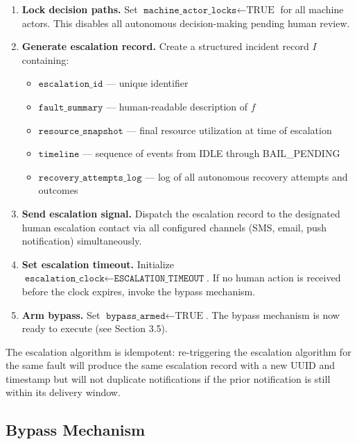 \begin{algorithm}
\caption{Escalation Algorithm}
\label{alg:escalation}
\begin{enumerate}
  \item \textbf{Lock decision paths.} Set $\texttt{machine\_actor\_locks} \leftarrow \text{TRUE}$ for all machine actors. This disables all autonomous decision-making pending human review.
  \item \textbf{Generate escalation record.} Create a structured incident record $I$ containing:
  \begin{itemize}
    \item $\texttt{escalation\_id}$ — unique identifier
    \item $\texttt{fault\_summary}$ — human-readable description of $f$
    \item $\texttt{resource\_snapshot}$ — final resource utilization at time of escalation
    \item $\texttt{timeline}$ — sequence of events from IDLE through BAIL\_PENDING
    \item $\texttt{recovery\_attempts\_log}$ — log of all autonomous recovery attempts and outcomes
  \end{itemize}
  \item \textbf{Send escalation signal.} Dispatch the escalation record to the designated human escalation contact via all configured channels (SMS, email, push notification) simultaneously.
  \item \textbf{Set escalation timeout.} Initialize $\texttt{escalation\_clock} \leftarrow \texttt{ESCALATION\_TIMEOUT}$. If no human action is received before the clock expires, invoke the bypass mechanism.
  \item \textbf{Arm bypass.} Set $\texttt{bypass\_armed} \leftarrow \text{TRUE}$. The bypass mechanism is now ready to execute (see Section 3.5).
\end{enumerate}
\end{algorithm}

\bigskip

The escalation algorithm is idempotent: re-triggering the escalation algorithm for the same fault will produce the same escalation record with a new UUID and timestamp but will not duplicate notifications if the prior notification is still within its delivery window.

\subsection{Bypass Mechanism}

